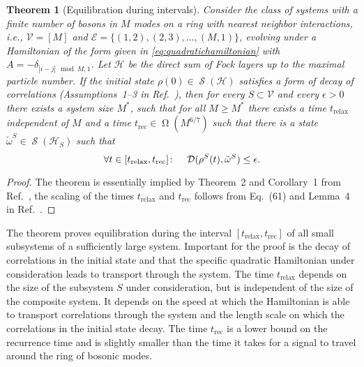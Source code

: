 \documentclass[a4paper,12pt,listof=totoc,index=totoc,bibliography=totoc,headsepline=false,headings=normal,BCOR16.153846mm,DIV12,headinclude,twoside,cleardoublepage=empty,numbers=noenddot,final]{scrreprt}
\theoremstyle{mystyle}
\numberwithin{equation}{section}
\numberwithin{figure}{section}
\numberwithin{lemma}{section}
\newtheorem{theorem}{Theorem}
\numberwithin{theorem}{section}
\numberwithin{corollary}{section}
\numberwithin{definition}{section}
\numberwithin{conjecture}{section}
\numberwithin{observation}{section}
\newcommand{\+}{\mkern2mu}
\newcommand{\itholds}{\colon\mathchoice{\quad}{}{}{}}
\newcommand{\Vset}{\mathcal{V}}
\newcommand{\Eset}{\mathcal{E}}
\newcommand{\tracedistance}[3][]{
  \ifthenelse{\equal{#2}{}}
  {\ifthenelse{\equal{#3}{}}
    {\mathcal{D}_{#1}}{}
  }{
    \ifthenelse{\equal{#1}{}}
    {\operatorname{\mathcal{D}}(#2,#3)}
    {\operatorname{\mathcal{D}}_{#1}(#2,#3)}
  }
}
\DeclareMathOperator{\landauOmega}{\Omega}
\DeclareMathOperator{\1}{\mathds{1}}
\DeclareMathOperator{\Qst}{\mathcal{S}}
\newcommand{\mc}[1]{\mathcal{#1}}
\newcommand{\mcH}{\mc{H}}
\begin{document}
\begin{theorem}[Equilibration during intervals] \label{thm:equilbrationduringintervals}
  Consider the class of systems with a finite number of bosons in $M$ modes on a ring with nearest neighbor interactions, i.e., $\Vset = [M]$ and $\Eset=\{(1,2),\allowbreak(2,3),\dots,(M,1)\}$, evolving under a Hamiltonian of the form given in \eqref{eq:quadratichamiltonian} with $A = -\delta_{|i-j| \mod M,1}$.
  Let $\mcH$ be the direct sum of Fock layers up to the maximal particle number.
  If the initial state $\rho(0) \in \Qst(\mcH)$ satisfies a form of decay of correlations (Assumptions~1--3 in Ref.~\cite{cramer10_1}), then for every $S \subset \Vset$ and every $\epsilon>0$ there exists a system size $M^\ast$, such that for all $M \geq M^\ast$ there exists a time $t_{\mathrm{relax}}$ independent of $M$ and a time $t_{\mathrm{rec}} \in \landauOmega(M^{6/7})$ such that there is a state $\tilde\omega^S \in\Qst(\mcH_S)$ such that
  \begin{equation}
    \forall t \in [t_{\mathrm{relax}},t_{\mathrm{rec}}]\itholds \tracedistance{\rho^S(t)}{\tilde\omega^S} \leq \epsilon .
  \end{equation}
\end{theorem}
\begin{proof}
  The theorem is essentially implied by Theorem~2 and Corollary~1 from Ref.~\cite{cramer10_1}, the scaling of the times $t_{\mathrm{relax}}$ and $t_{\mathrm{rec}}$ follows from Eq.~(61) and Lemma~4 in Ref.~\cite{cramer10_1}.
\end{proof}
The theorem proves equilibration during the interval $[t_{\mathrm{relax}},t_{\mathrm{rec}}]$ of all small subsystems of a sufficiently large system.
Important for the proof is the decay of correlations in the initial state and that the specific quadratic Hamiltonian under consideration leads to transport through the system.
The time $t_{\mathrm{relax}}$ depends on the size of the subsystem $S$ under consideration, but is independent of the size of the composite system.
It depends on the speed at which the Hamiltonian is able to transport correlations through the system and the length scale on which the correlations in the initial state decay.
The time $t_{\mathrm{rec}}$ is a lower bound on the recurrence time and is slightly smaller than the time it takes for a signal to travel around the ring of bosonic modes.
\end{document}
